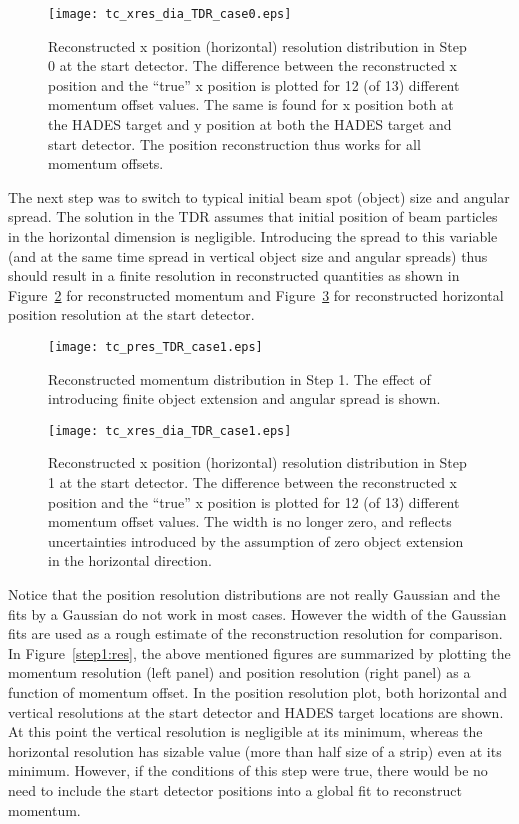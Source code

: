 \documentclass[20]{article}
\begin{document}
\begin{figure}[tbp]
  \texttt{[image: tc\_xres\_dia\_TDR\_case0.eps]}
  \caption{Reconstructed x position (horizontal) resolution
    distribution in Step 0 at the start detector. The difference
    between the reconstructed x position and the ``true'' x position
    is plotted for 12 (of 13) different momentum offset values. The
    same is found for x position both at the HADES target and y
    position at both the HADES target and start detector. The position
    reconstruction thus works for all momentum offsets.}
  \label {step0:xres}
\end{figure}

The next step was to switch to typical initial beam spot (object) size
and angular spread. The solution in the TDR assumes that initial
position of beam particles in the horizontal dimension is
negligible. Introducing the spread to this variable (and at the same
time spread in vertical object size and angular spreads) thus should
result in a finite resolution in reconstructed quantities as shown in
Figure~\ref{step1:pres} for reconstructed momentum and
Figure~\ref{step1:xres} for reconstructed horizontal position
resolution at the start detector.
                                   
\begin{figure}[tbp]
  \texttt{[image: tc\_pres\_TDR\_case1.eps]}
  \caption{Reconstructed momentum distribution in Step 1. The effect
    of introducing finite object extension and angular spread is
    shown. }
  \label {step1:pres}
\end{figure}


\begin{figure}[tbp]
  \texttt{[image: tc\_xres\_dia\_TDR\_case1.eps]}
  \caption{Reconstructed x position (horizontal) resolution
    distribution in Step 1 at the start detector. The difference
    between the reconstructed x position and the ``true'' x position
    is plotted for 12 (of 13) different momentum offset values. The
    width is no longer zero, and reflects uncertainties introduced by
    the assumption of zero object extension in the horizontal
    direction.}
  \label {step1:xres}
\end{figure}

Notice that the position resolution distributions are not really
Gaussian and the fits by a Gaussian do not work in most cases. However
the width of the Gaussian fits are used as a rough estimate of the
reconstruction resolution for comparison. In Figure~\ref{step1:res},
the above mentioned figures are summarized by plotting the momentum
resolution (left panel) and position resolution (right panel) as a
function of momentum offset. In the position resolution plot, both
horizontal and vertical resolutions at the start detector and HADES
target locations are shown. At this point the vertical resolution is
negligible at its minimum, whereas the horizontal resolution has
sizable value (more than half size of a strip) even at its
minimum. However, if the conditions of this step were true, there
would be no need to include the start detector positions into a global
fit to reconstruct momentum.
\end{document}
